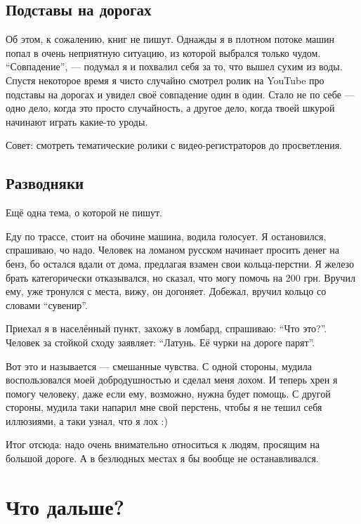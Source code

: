 \documentclass[12pt,a4paper]{article}
\begin{document}
\subsection{Подставы на дорогах}

Об этом, к сожалению, книг не пишут. Однажды я в плотном потоке
машин попал в очень неприятную ситуацию, из которой выбрался только
чудом. ``Совпадение'', --- подумал я и похвалил себя за то, что вышел
сухим из воды. Спустя некоторое время я чисто случайно смотрел
ролик на YouTube про подставы на дорогах и увидел своё совпадение
один в один. Стало не по себе --- одно дело, когда это просто
случайность, а другое дело, когда твоей шкурой начинают играть
какие-то уроды.

Совет: смотреть тематические ролики с видео-регистраторов до
просветления.

\subsection{Разводняки}

Ещё одна тема, о которой не пишут.

Еду по трассе, стоит на обочине машина, водила голосует.
Я остановился, спрашиваю, чо надо. Человек на ломаном русском
начинает просить денег на бенз, бо остался вдали от дома, предлагая
взамен свои кольца-перстни. Я железо брать категорически отказывался,
но сказал, что могу помочь на 200 грн. Вручил ему, уже тронулся с
места, вижу, он догоняет. Добежал, вручил кольцо со словами ``сувенир''.

Приехал я в населённый пункт, захожу в ломбард, спрашиваю: ``Что это?''.
Человек за стойкой сходу заявляет: ``Латунь. Её чурки на дороге парят''.

Вот это и называется --- смешанные чувства. С одной стороны, мудила
воспользовался моей добродушностью и сделал меня лохом. И теперь хрен
я помогу человеку, даже если ему, возможно, нужна будет помощь. С другой
стороны, мудила таки напарил мне свой перстень, чтобы я не тешил себя
иллюзиями, а таки узнал, что я лох :)

Итог отсюда: надо очень внимательно относиться к людям, просящим на
большой дороге. А в безлюдных местах я бы вообще не останавливался.

\clearpage

\section{Что дальше?}
\end{document}
